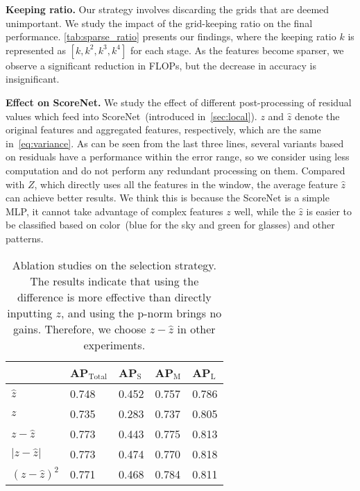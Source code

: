 \vspace{2mm}\noindent\textbf{Keeping ratio.} 
%
Our strategy involves discarding the grids that are deemed unimportant. We study the impact of the grid-keeping ratio on the final performance. \cref{tab:sparse_ratio} presents our findings, where the keeping ratio $k$ is represented as $[k, k^2, k^3, k^4]$ for each stage. As the features become sparser, we observe a significant reduction in FLOPs, but the decrease in accuracy is insignificant.

\vspace{2mm}\noindent\textbf{Effect on ScoreNet.}
\label{sec:study_scorenet}
%
We study the effect of different post-processing of residual values which feed into ScoreNet~(introduced in~\cref{sec:local}). $z$ and $\hat{z}$ denote the original features and aggregated features, respectively, which are the same in~\cref{eq:variance}. 
As can be seen from the last three lines, several variants based on residuals have a performance within the error range, so we consider using less computation and do not perform any redundant processing on them.
Compared with $Z$, which directly uses all the features in the window, the average feature $\hat{z}$ can achieve better results. We think this is because the ScoreNet is a simple MLP, it cannot take advantage of complex features $z$ well, while the $\hat{z}$ is easier to be classified based on color~(blue for the sky and green for glasses) and other patterns.




\begin{table}[]
\centering
\caption{Ablation studies on the selection strategy. The results indicate that using the difference is more effective than directly inputting \(z\), and using the p-norm brings no gains. Therefore, we choose \(z - \hat{z}\) in other experiments.}
\vspace{-10pt}
\label{tab:score}
\begin{tabularx}{0.5\textwidth}{X|XXXX}
\hline
                & AP$_{\text{Total}}$ & AP$_{\text{S}}$ & AP$_{\text{M}}$ & AP$_{\text{L}}$ \\ \hline
$\hat{z}$       & 0.748        & 0.452    & 0.757    & 0.786    \\
$z$             & 0.735        & 0.283    & 0.737    & 0.805    \\
$z-\hat{z}$     & 0.773        & 0.443    & 0.775    & 0.813    \\
$|z-\hat{z}|$   & 0.773        & 0.474    & 0.770    & 0.818    \\
$(z-\hat{z})^2$ & 0.771        & 0.468    & 0.784    & 0.811    \\ \hline
\end{tabularx}
\end{table}




